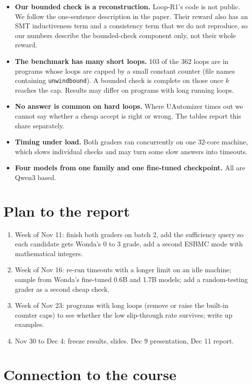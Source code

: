 \documentclass[11pt]{article}
\newcommand{\code}[1]{\texttt{#1}}
\begin{document}
\begin{itemize}
\item \textbf{Our bounded check is a reconstruction.} Loop-R1's code is not public. We follow the
one-sentence description in the paper. Their reward also has an SMT inductiveness term and a
consistency term that we do not reproduce, so our numbers describe the bounded-check component
only, not their whole reward.
\item \textbf{The benchmark has many short loops.} 103 of the 362 loops are in programs whose
loops are capped by a small constant counter (file names containing \code{unwindbound}). A bounded
check is complete on those once $k$ reaches the cap. Results may differ on programs with long
running loops.
\item \textbf{No answer is common on hard loops.} Where UAutomizer times out we cannot say whether
a cheap accept is right or wrong. The tables report this share separately.
\item \textbf{Timing under load.} Both graders ran concurrently on one 32-core machine, which
slows individual checks and may turn some slow answers into timeouts.
\item \textbf{Four models from one family and one fine-tuned checkpoint.} All are Qwen3 based.
\end{itemize}

\section{Plan to the report}

\begin{enumerate}
\item Week of Nov 11: finish both graders on batch 2, add the sufficiency query so each candidate
gets Wonda's 0 to 3 grade, add a second ESBMC mode with mathematical integers.
\item Week of Nov 16: re-run timeouts with a longer limit on an idle machine; sample from
Wonda's fine-tuned 0.6B and 1.7B models; add a random-testing grader as a second cheap check.
\item Week of Nov 23: programs with long loops (remove or raise the built-in counter caps) to see
whether the low slip-through rate survives; write up examples.
\item Nov 30 to Dec 4: freeze results, slides. Dec 9 presentation, Dec 11 report.
\end{enumerate}

\section{Connection to the course}
\end{document}
